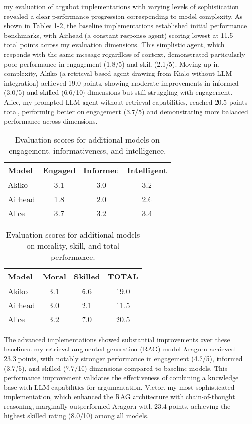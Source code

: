 \documentclass[11pt]{article}
\begin{document}
 my evaluation of argubot implementations with varying levels of sophistication revealed a clear performance progression corresponding to model complexity. As shown in Tables 1-2, the baseline implementations established initial performance benchmarks, with Airhead (a constant response agent) scoring lowest at 11.5 total points across  my evaluation dimensions. This simplistic agent, which responds with the same message regardless of context, demonstrated particularly poor performance in engagement (1.8/5) and skill (2.1/5). Moving up in complexity, Akiko (a retrieval-based agent drawing from Kialo without LLM integration) achieved 19.0 points, showing moderate improvements in informed (3.0/5) and skilled (6.6/10) dimensions but still struggling with engagement. Alice,  my prompted LLM agent without retrieval capabilities, reached 20.5 points total, performing better on engagement (3.7/5) and demonstrating more balanced performance across dimensions.


\small
\begin{table}[t]
\centering
\begin{tabular}{lccc}
    \hline
    {Model} & {Engaged} & {Informed} & {Intelligent} \\
    \hline
    Akiko & 3.1 & 3.0 & 3.2 \\
    Airhead & 1.8 & 2.0 & 2.6 \\
    Alice & 3.7 & 3.2 & 3.4 \\
    \hline
\end{tabular}
\caption{Evaluation scores for additional models on engagement, informativeness, and intelligence.}
\label{tab:base_evaluation_part1}
\end{table}

\small
\begin{table}[t]
\centering
\begin{tabular}{lccc}
    \hline
    {Model} & {Moral} & {Skilled} & \textbf{TOTAL} \\
    \hline
    Akiko & 3.1 & 6.6 & 19.0 \\
    Airhead & 3.0 & 2.1 & 11.5 \\
    Alice & 3.2 & 7.0 & 20.5 \\
    \hline
\end{tabular}
\caption{Evaluation scores for additional models on morality, skill, and total performance.}
\label{tab:base_evaluation_part2}
\end{table}

The advanced implementations showed substantial improvements over these baselines.  my retrieval-augmented generation (RAG) model Aragorn achieved 23.3 points, with notably stronger performance in engagement (4.3/5), informed (3.7/5), and skilled (7.7/10) dimensions compared to baseline models. This performance improvement validates the effectiveness of combining a knowledge base with LLM capabilities for argumentation. Victor,  my most sophisticated implementation, which enhanced the RAG architecture with chain-of-thought reasoning, marginally outperformed Aragorn with 23.4 points, achieving the highest skilled rating (8.0/10) among all models.
\end{document}
